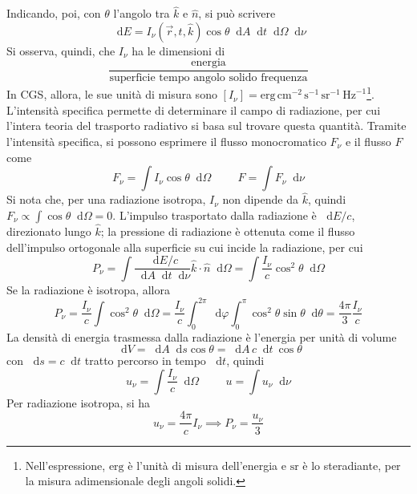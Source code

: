 \documentclass[11pt, a4paper]{scrartcl}
\theoremstyle{style}
\theoremstyle{style1}
\newcommand{\dd}{\mathop{}\!\mathrm{d}}
\numberwithin{equation}{subsection}
\begin{document}
Indicando, poi, con $\theta $ l'angolo tra $\hat{k}$ e $\hat{n}$, si pu\`o scrivere
\begin{equation}
	\dd E = I_\nu (\vec{r},t,\hat{k}) \cos \theta   \dd A\dd t\dd\Omega \dd\nu 
\end{equation}
Si osserva, quindi, che $I_\nu $ ha le dimensioni di 
\[
\frac{\text{energia}}{\text{superficie }\text{tempo } \text{angolo solido } \text{frequenza}}
\] 
In CGS, allora, le sue unit\`a di misura sono $[I_\nu ] = \mathrm{erg} \, \mathrm{cm} ^{-2} \, \mathrm{s} ^{-1}\, \mathrm{sr} ^{-1} \, \mathrm{Hz} ^{-1}$\footnote{Nell'espressione, $\mathrm{erg} $ \`e l'unit\`a di misura dell'energia e $\mathrm{sr} $ \`e lo steradiante, per la misura adimensionale degli angoli solidi.}.
L'intensit\`a specifica permette di determinare il campo di radiazione, per cui l'intera teoria del trasporto radiativo si basa sul trovare questa quantit\`a.
Tramite l'intensit\`a specifica, si possono esprimere il flusso monocromatico $F_\nu $ e il flusso $F$ come
\begin{equation}
F_\nu = \int I_\nu \cos \theta \dd\Omega  \hspace{1cm} F = \int F_\nu \dd\nu 
\end{equation}
Si nota che, per una radiazione isotropa, $I_\nu $ non dipende da $\hat{k}$, quindi $F_\nu \propto \int \cos \theta \dd\Omega  = 0$.
L'impulso trasportato dalla radiazione \`e $\dd E / c$, direzionato lungo $\hat{k}$; la pressione di radiazione \`e ottenuta come il flusso dell'impulso ortogonale alla superficie su cui incide la radiazione, per cui 
\begin{equation}
P_\nu = \int \frac{\dd E / c}{\dd A \dd t\dd\nu }\hat{k}\cdot \hat{n} \dd\Omega = \int \frac{I_\nu }{c} \cos ^2 \theta \dd\Omega 
\end{equation}
Se la radiazione \`e isotropa, allora
\[
P_\nu  = \frac{I_\nu }{c} \int \cos^2 \theta \dd\Omega = \frac{I_\nu }{c} \int _0^{2\pi} \dd\varphi  \int _0^\pi \cos^2 \theta \sin\theta \dd\theta = \frac{4\pi}{3}\frac{I_\nu }{c}
\] 
La densit\`a di energia trasmessa dalla radiazione \`e l'energia per unit\`a di volume 
\[
\dd V = \dd A \dd s \cos \theta  = \dd A \, c\dd t\ \cos \theta 
\] 
con $\dd s = c\dd t$ tratto percorso in tempo $\dd t$, quindi 
\begin{equation}
u_\nu  = \int \frac{I_\nu }{c} \dd\Omega \hspace{1cm} u = \int u_\nu  \dd\nu  
\end{equation}
Per radiazione isotropa, si ha
\[
u_\nu  = \frac{4\pi }{c} I_\nu \implies P_\nu  = \frac{u_\nu }{3}
\] 
\end{document}
